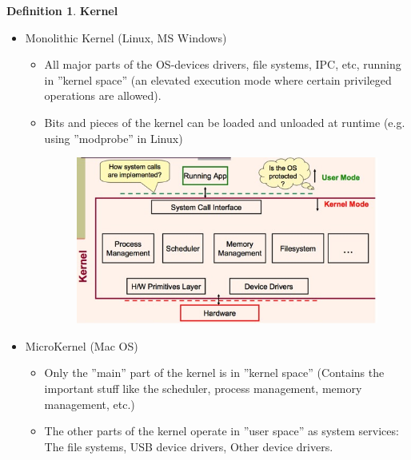\documentclass[11pt,a4paper]{article}
\theoremstyle{definition}
\newtheorem{definition}{Definition}[section]
\newenvironment{myitemize}
{ \begin{itemize}
    \setlength{\itemsep}{5pt}
    \setlength{\parskip}{0pt}
    \setlength{\parsep}{0pt}     }
{ \end{itemize}                  }
\begin{document}
\begin{definition}{\textbf{Kernel}}
	\begin{myitemize}
		\item \textsf{Monolithic Kernel} (Linux, MS Windows)
		\begin{myitemize}
			\item All major parts of the OS-devices drivers, file systems, IPC, etc, running in ''kernel space'' (an elevated execution mode where certain privileged operations are allowed).
			\item Bits and pieces of the kernel can be loaded and unloaded at runtime (e.g. using ''modprobe'' in Linux)
			\begin{figure}[h!]
				\includegraphics[scale=0.35]{m1/monolithicKernels}
				\centering
			\end{figure}
		\end{myitemize}
		\item \textsf{MicroKernel} (Mac OS)
		\begin{myitemize}
			\item Only the ''main'' part of the kernel is in ''kernel space'' (Contains the important stuff like the scheduler, process management, memory management, etc.)
			\item The other parts of the kernel operate in ''user space'' as system services: The file systems, USB device drivers, Other device drivers.
		\end{myitemize}
	\end{myitemize}
\end{definition}
\end{document}
